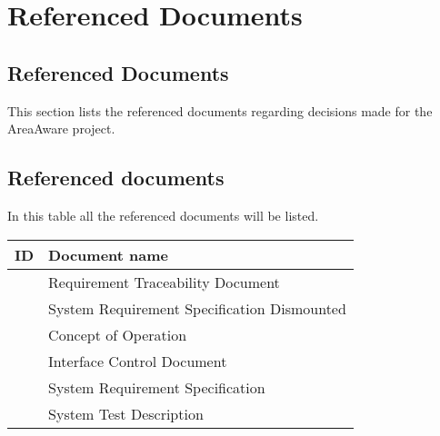 \chapter{Referenced Documents}

\section{Referenced Documents}
This section lists the referenced documents regarding decisions made for the AreaAware project.
\section{Referenced documents}
In this table all the referenced documents will be listed.

\begin{tabular}{b{6.5cm} b{7cm}}
	\textbf{ID} & \textbf{Document name} \\
	\hline
	\rtm & Requirement Traceability Document \\
	\srsdis & System Requirement Specification Dismounted \\
	\conops & Concept of Operation\\
	\picd & Interface Control Document\\
	\srshq & System Requirement Specification\\
	\std & System Test Description\\
\end{tabular}